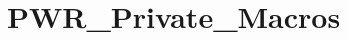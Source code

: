\hypertarget{group___p_w_r___private___macros}{\section{P\-W\-R\-\_\-\-Private\-\_\-\-Macros}
\label{group___p_w_r___private___macros}
}
